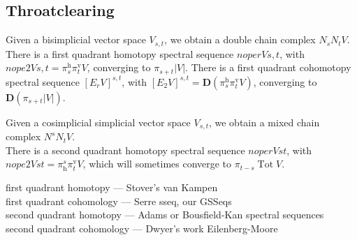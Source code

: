 \documentclass[11pt]{amsart} \renewcommand{\baselinestretch}{1.2}
\theoremstyle{plain}
\numberwithin{equation}{section} %
\theoremstyle{plain}
\numberwithin{equation}{chapter} %
\DeclareMathOperator{\Tot}{Tot}
\renewcommand{\to}{\longrightarrow}
\newcommand{\calU}{\mathcal{U}}
\newcommand{\calw}{\mathcal{W}}
\newcommand{\Edown}[4]{[E_{#1}#2]^{#3}_{#4}}
\newcommand{\uver}{^\mathrm{v}}
\newcommand{\uhor}{^\mathrm{h}}
\newcommand{\dhor}{_\mathrm{h}}
\newcommand{\diag}[1]{|#1|}
\newcommand{\dual}{\mathbf{D}}
\newcommand{\SubsectionOrSection}[1]{\subsection{#1}}
\begin{document}
\begin{random junk}

\SubsectionOrSection{Throatclearing}

Given a bisimplicial vector space $V_{s,t}$, we obtain a double chain complex $N_sN_tV$. There is a first quadrant homotopy spectral sequence $nope{r}{}{V}{}{s,t}$, with $nope{2}{}{V}{}{s,t}=\pi\uhor_s\pi\uver_tV$, converging to $\pi_{s+t}\diag{ V}$.
There is a first quadrant cohomotopy spectral sequence $\Edown{r}{V}{s,t}{}$, with $\Edown{2}{V}{s,t}{}=\dual(\pi\uhor_s\pi\uver_tV)$, converging to $\dual(\pi_{s+t}\diag{ V})$.

Given a cosimplicial simplicial vector space  $V_{s,t}$, we obtain a mixed chain complex $N^sN_tV$.\\
There is a second quadrant homotopy spectral sequence $nope{r}{}{V}{s}{t}$, with $nope{2}{}{V}{s}{t}=\pi\dhor^s\pi\uver_tV$, which will sometimes converge to $\pi_{t-s}\Tot V$.


\noindent first quadrant homotopy --- Stover's van Kampen\\
first quadrant cohomology --- Serre sseq, our GSSeqs\\
second quadrant homotopy --- Adams or Bousfield-Kan spectral sequences\\
second quadrant cohomology --- Dwyer's work Eilenberg-Moore









\end{random junk}
\end{document}
